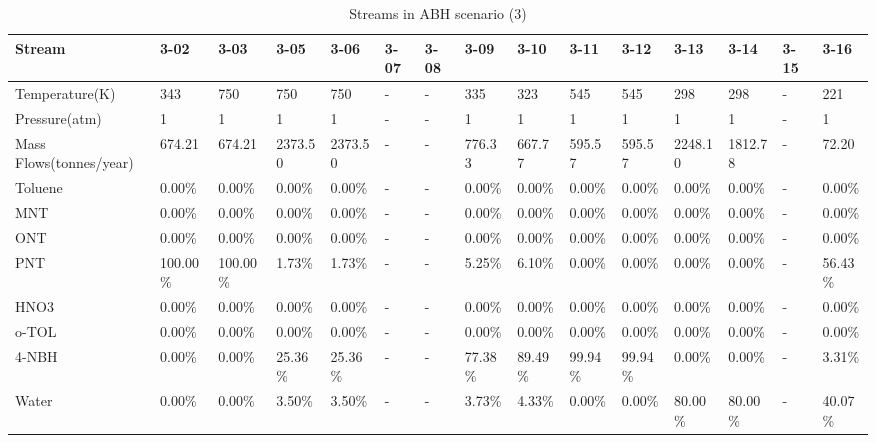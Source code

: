 \begin{landscape}
\begin{table}[H]
\centering
\caption{Streams in ABH scenario (3)}
\label{ABHFST3}
\begin{tabular}{|l|l|l|l|l|l|l|l|l|l|l|l|l|l|l|}
\hline
\textbf{Stream}         & 3-02     & 3-03     & 3-05    & 3-06    & 3-07 & 3-08 & 3-09    & 3-10    & 3-11    & 3-12    & 3-13    & 3-14    & 3-15 & 3-16    \\ \hline
Temperature(K)          & 343      & 750      & 750     & 750     & -    & -    & 335     & 323     & 545     & 545     & 298     & 298     & -    & 221     \\ \hline
Pressure(atm)           & 1        & 1        & 1       & 1       & -    & -    & 1       & 1       & 1       & 1       & 1       & 1       & -    & 1       \\ \hline
Mass Flows(tonnes/year) & 674.21   & 674.21   & 2373.50 & 2373.50 & -    & -    & 776.33  & 667.77  & 595.57  & 595.57  & 2248.10 & 1812.78 & -    & 72.20   \\ \hline
Toluene                 & 0.00\%   & 0.00\%   & 0.00\%  & 0.00\%  & -    & -    & 0.00\%  & 0.00\%  & 0.00\%  & 0.00\%  & 0.00\%  & 0.00\%  & -    & 0.00\%  \\ \hline
MNT                     & 0.00\%   & 0.00\%   & 0.00\%  & 0.00\%  & -    & -    & 0.00\%  & 0.00\%  & 0.00\%  & 0.00\%  & 0.00\%  & 0.00\%  & -    & 0.00\%  \\ \hline
ONT                     & 0.00\%   & 0.00\%   & 0.00\%  & 0.00\%  & -    & -    & 0.00\%  & 0.00\%  & 0.00\%  & 0.00\%  & 0.00\%  & 0.00\%  & -    & 0.00\%  \\ \hline
PNT                     & 100.00\% & 100.00\% & 1.73\%  & 1.73\%  & -    & -    & 5.25\%  & 6.10\%  & 0.00\%  & 0.00\%  & 0.00\%  & 0.00\%  & -    & 56.43\% \\ \hline
HNO3                    & 0.00\%   & 0.00\%   & 0.00\%  & 0.00\%  & -    & -    & 0.00\%  & 0.00\%  & 0.00\%  & 0.00\%  & 0.00\%  & 0.00\%  & -    & 0.00\%  \\ \hline
o-TOL                   & 0.00\%   & 0.00\%   & 0.00\%  & 0.00\%  & -    & -    & 0.00\%  & 0.00\%  & 0.00\%  & 0.00\%  & 0.00\%  & 0.00\%  & -    & 0.00\%  \\ \hline
4-NBH                   & 0.00\%   & 0.00\%   & 25.36\% & 25.36\% & -    & -    & 77.38\% & 89.49\% & 99.94\% & 99.94\% & 0.00\%  & 0.00\%  & -    & 3.31\%  \\ \hline
Water                   & 0.00\%   & 0.00\%   & 3.50\%  & 3.50\%  & -    & -    & 3.73\%  & 4.33\%  & 0.00\%  & 0.00\%  & 80.00\% & 80.00\% & -    & 40.07\% \\ \hline

\end{tabular}
\end{table}
\end{landscape}
